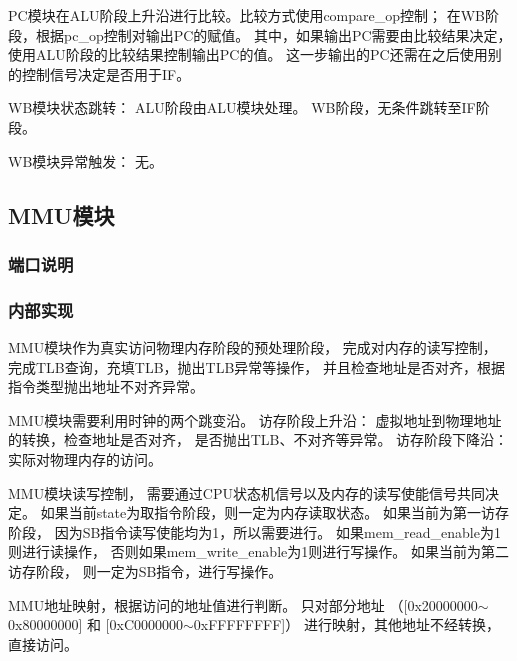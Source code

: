             PC模块在ALU阶段上升沿进行比较。比较方式使用compare\_op控制；%
            在WB阶段，根据pc\_op控制对输出PC的赋值。%
            其中，如果输出PC需要由比较结果决定，%
            使用ALU阶段的比较结果控制输出PC的值。%
            这一步输出的PC还需在之后使用别的控制信号决定是否用于IF。

            WB模块状态跳转：%
	        ALU阶段由ALU模块处理。%
	        WB阶段，无条件跳转至IF阶段。

            WB模块异常触发：%
	        无。

    \subsection{MMU模块}
        \subsubsection{端口说明}
            
        \subsubsection{内部实现}
            MMU模块作为真实访问物理内存阶段的预处理阶段，%
            完成对内存的读写控制，%
            完成TLB查询，充填TLB，抛出TLB异常等操作，%
            并且检查地址是否对齐，根据指令类型抛出地址不对齐异常。
            
            MMU模块需要利用时钟的两个跳变沿。%
            访存阶段上升沿：%
                虚拟地址到物理地址的转换，检查地址是否对齐，%
                是否抛出TLB、不对齐等异常。%
            访存阶段下降沿：%
                实际对物理内存的访问。%
            
            MMU模块读写控制，%
            需要通过CPU状态机信号以及内存的读写使能信号共同决定。%
                如果当前state为取指令阶段，则一定为内存读取状态。%
                如果当前为第一访存阶段，%
                    因为SB指令读写使能均为1，所以需要进行。%
                    如果mem\_read\_enable为1则进行读操作，%
                    否则如果mem\_write\_enable为1则进行写操作。%
                如果当前为第二访存阶段，%
                    则一定为SB指令，进行写操作。%
            
            MMU地址映射，根据访问的地址值进行判断。%
            只对部分地址%
            （[0x20000000$\sim$0x80000000]%
            和%
            [0xC0000000$\sim$0xFFFFFFFF]）%
            进行映射，其他地址不经转换，直接访问。%
            
